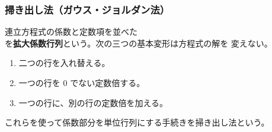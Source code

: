 \subsubsection{掃き出し法（ガウス・ジョルダン法）}

連立方程式の係数と定数項を並べた
\begin{equation}
 [A\mid\vect{b}]
\end{equation}
を\textbf{拡大係数行列}という。次の三つの基本変形は方程式の解を
変えない。
\begin{enumerate}
 \item 二つの行を入れ替える。
 \item 一つの行を $0$ でない定数倍する。
 \item 一つの行に、別の行の定数倍を加える。
\end{enumerate}
これらを使って係数部分を単位行列にする手続きを掃き出し法という。

